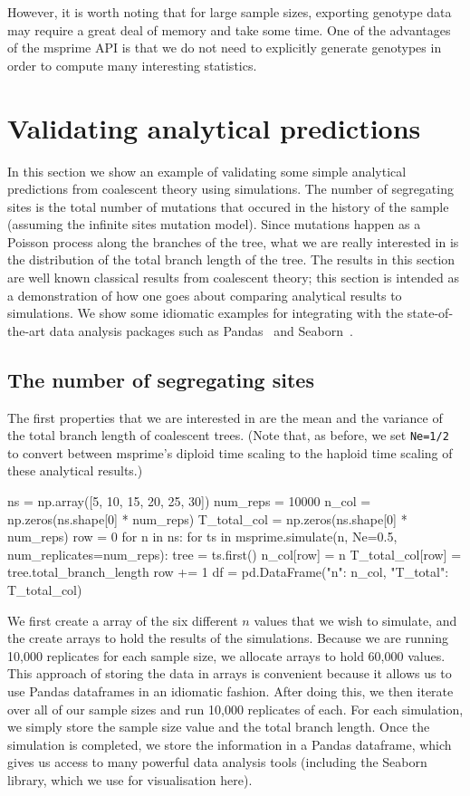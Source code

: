 \documentclass[graybox]{svmult}
\begin{document}
However, it is worth noting that for large sample sizes, exporting
genotype data may require a great deal of memory and take some time. One
of the advantages of the msprime API is that we do not need to
explicitly generate genotypes in order to compute many interesting
statistics.

\section{Validating analytical predictions}\label{validating-analytical-predictions}

In this section we show an example of validating some simple analytical
predictions from coalescent theory using simulations. The number of
segregating sites is the total number of mutations that occured in the
history of the sample (assuming the infinite sites mutation model).
Since mutations happen as a Poisson process along the branches of the
tree, what we are really interested in is the distribution of the total
branch length of the tree. The results in this section are well known
classical results from coalescent theory; this section is intended as a
demonstration of how one goes about comparing analytical results to
simulations. We show some idiomatic examples for integrating with
the state-of-the-art data analysis packages such
as Pandas~\citep{mckinney2010data} and Seaborn~\citep{michael_waskom_2017_883859}.

\subsection{The number of segregating sites}
The first properties that we are interested in are the mean and the
variance of the total branch length of coalescent trees. (Note that, as
before, we set \texttt{Ne=1/2} to convert between msprime's diploid time
scaling to the haploid time scaling of these analytical results.)

\begin{pythoncode}
ns = np.array([5, 10, 15, 20, 25, 30])
num_reps = 10000
n_col = np.zeros(ns.shape[0] * num_reps)
T_total_col = np.zeros(ns.shape[0] * num_reps)
row = 0
for n in ns:
    for ts in msprime.simulate(n, Ne=0.5, num_replicates=num_reps):
        tree = ts.first()
        n_col[row] = n
        T_total_col[row] = tree.total_branch_length
        row += 1
df = pd.DataFrame({"n": n_col, "T_total": T_total_col})
\end{pythoncode}

    We first create a array of the six different \(n\) values that we wish
to simulate, and the create arrays to hold the results of the
simulations. Because we are running 10,000 replicates for each sample
size, we allocate arrays to hold 60,000 values. This approach of storing
the data in arrays is convenient because it allows us to use Pandas
dataframes in an idiomatic fashion. After doing this, we then iterate
over all of our sample sizes and run 10,000 replicates of each. For each
simulation, we simply store the sample size value and the total branch
length. Once the simulation is completed, we store the information in a
Pandas dataframe, which gives us access to many powerful data analysis
tools (including the Seaborn library, which we use for visualisation
here).
\end{document}

